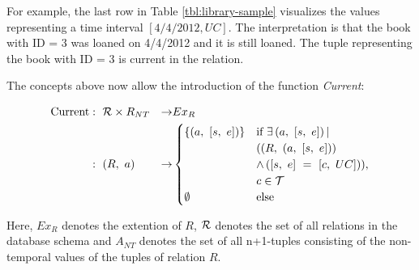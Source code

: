 
For example, the last row in Table \ref{tbl:library-sample} visualizes the values representing a time interval $\left[4/4/2012 , UC \right]$. The interpretation is that the book with ID = 3 was loaned on 4/4/2012 and it is still loaned. The tuple representing the book with ID = 3 is current in the relation.

The concepts above now allow the introduction of the function \emph{Current}:

\begin{align}
\text{Current} & :\ \Rel \times R_{NT} & \rightarrow & Ex_{R} \nonumber \\
               & :\ \left(R,\ a\right) & \rightarrow &
 \begin{cases}
  \left\{\left(a,\ \left[s,\ e\right]\right)\right\} & \text{if } \exists \left(a,\ \left[s,\ e\right]\right)| \\
  									 & (\left(R,\ \left(a,\ \left[s,\ e\right]\right)\right)\\
  									 & \wedge \left(\left[s,\ e\right]\ =\ \left[c,\ UC\right]\right)), \\
  									 & c \in \T \\
  \emptyset & \text{else}
 \end{cases}
 \nonumber
\end{align}

Here, $Ex_{R}$ denotes the extention of $R$, $\mathcal{R}$ denotes the set of all relations in the database schema and $A_{NT}$ denotes the set of all n+1-tuples consisting of the non-temporal values of the tuples of relation $R$.





